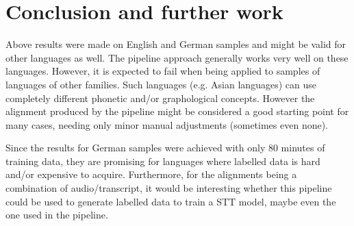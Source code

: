 \documentclass[letterpaper]{article}
\begin{document}
\section{Conclusion and further work}

Above results were made on English and German samples and might be valid for other languages as well. The pipeline approach generally works very well on these languages. However, it is expected to fail when being applied to samples of languages of other families. Such languages (e.g. Asian languages) can use completely different phonetic and/or graphological concepts. However the alignment produced by the pipeline might be considered a good starting point for many cases, needing only minor manual adjustments (sometimes even none).

Since the results for German samples were achieved with only 80 minutes of training data, they are promising for languages where labelled data is hard and/or expensive to acquire. Furthermore, for the alignments being a combination of audio/transcript, it would be interesting whether this pipeline could be used to generate labelled data to train a STT model, maybe even the one used in the pipeline.


\footnotesize
\printbibliography
%
%
\end{document}
